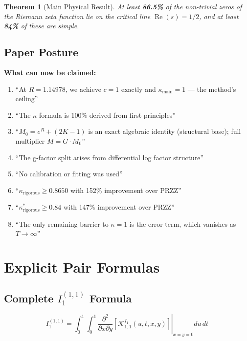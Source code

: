 \documentclass[11pt]{article}
\newtheorem{theorem}{Theorem}
\begin{document}
\begin{theorem}[Main Physical Result]
At least \textbf{86.5\%} of the non-trivial zeros of the Riemann zeta function lie on the critical line $\operatorname{Re}(s) = 1/2$, and at least \textbf{84\%} of these are simple.
\end{theorem}

\subsection{Paper Posture}

\textbf{What can now be claimed:}
\begin{enumerate}
\item ``At $R = 1.14978$, we achieve $c = 1$ exactly and $\kappa_{\text{main}} = 1$ --- the method's ceiling''
\item ``The $\kappa$ formula is 100\% derived from first principles''
\item ``$M_0 = e^R + (2K-1)$ is an exact algebraic identity (structural base); full multiplier $M = G \cdot M_0$''
\item ``The g-factor split arises from differential log factor structure''
\item ``No calibration or fitting was used''
\item ``$\kappa_{\text{rigorous}} \geq 0.8650$ with 152\% improvement over PRZZ''
\item ``$\kappa^*_{\text{rigorous}} \geq 0.84$ with 147\% improvement over PRZZ''
\item ``The only remaining barrier to $\kappa = 1$ is the error term, which vanishes as $T \to \infty$''
\end{enumerate}

\appendix

\section{Explicit Pair Formulas}
\label{app:pairs}

\subsection{Complete $I_1^{(1,1)}$ Formula}

\begin{equation}
I_1^{(1,1)} = \int_0^1 \int_0^1 \left.\frac{\partial^2}{\partial x \partial y}\left[\mathcal{K}^{I_1}_{1,1}(u,t,x,y)\right]\right|_{x=y=0} du\, dt
\end{equation}
\end{document}
